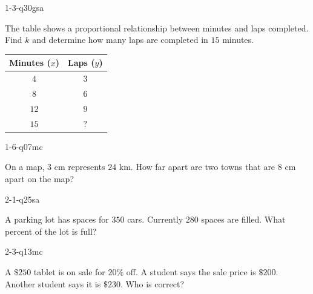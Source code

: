 
\begin{practiceQuestion}{1-3-q30}{gsa}
\begin{questionText}
The table shows a proportional relationship between minutes and laps completed. Find $k$ and determine how many laps are completed in $15$ minutes.

\begin{center}
\begin{tabular}{|c|c|}
\hline
\textbf{Minutes ($x$)} & \textbf{Laps ($y$)} \\ \hline
$4$ & $3$ \\ \hline
$8$ & $6$ \\ \hline
$12$ & $9$ \\ \hline
$15$ & $?$ \\ \hline
\end{tabular}
\end{center}
\end{questionText}
\end{practiceQuestion}

\begin{practiceQuestion}{1-6-q07}{mc}
\begin{questionText}
On a map, $3$ cm represents $24$ km. How far apart are two towns that are $8$ cm apart on the map?
\end{questionText}
\end{practiceQuestion}

\begin{practiceQuestion}{2-1-q25}{sa}
\begin{questionText}
A parking lot has spaces for $350$ cars. Currently $280$ spaces are filled. What percent of the lot is full?
\end{questionText}
\end{practiceQuestion}

\begin{practiceQuestion}{2-3-q13}{mc}
\begin{questionText}
A $\$250$ tablet is on sale for $20\%$ off. A student says the sale price is $\$200$. Another student says it is $\$230$. Who is correct?


\end{questionText}
\end{practiceQuestion}

